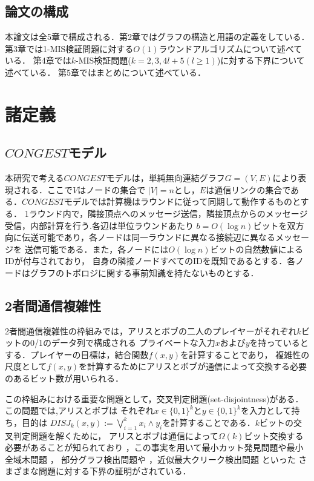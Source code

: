 \documentclass[12pt]{thesis}
\theoremstyle{definition}
\begin{document}
\section{論文の構成}
本論文は全5章で構成される．第2章ではグラフの構造と用語の定義をしている．
第3章では1-MIS検証問題に対する$O(1)$ラウンドアルゴリズムについて述べている．
第4章では$k$-MIS検証問題($k = 2, 3, 4l + 5 ( l \geq 1)$)に対する下界について述べている．
第5章ではまとめについて述べている．

\chapter{諸定義}

\section{$CONGEST$モデル}
本研究で考える$CONGEST$モデルは，単純無向連結グラフ$G = (V, E)$により表現される．ここで$V$はノードの集合で
$|V| = n$とし，$E$は通信リンクの集合である．$CONGEST$モデルでは計算機はラウンドに従って同期して動作するものとする．
1ラウンド内で，隣接頂点へのメッセージ送信，隣接頂点からのメッセージ受信，内部計算を行う.各辺は単位ラウンドあたり
$b = O(\log n)$ビットを双方向に伝送可能であり，各ノードは同一ラウンドに異なる接続辺に異なるメッセージを
送信可能である．また，各ノードには$O(\log n)$ビットの自然数値によるIDが付与されており，
自身の隣接ノードすべてのIDを既知であるとする．各ノードはグラフのトポロジに関する事前知識を持たないものとする．

\section{2者間通信複雑性}
2者間通信複雑性の枠組みでは，アリスとボブの二人のプレイヤーがそれぞれ$k$ビットの0/1のデータ列で構成される
プライベートな入力$x$および$y$を持っているとする．プレイヤーの目標は，結合関数$f(x, y)$を計算することであり，
複雑性の尺度として$f(x, y)$を計算するためにアリスとボブが通信によって交換する必要のあるビット数が用いられる．

この枠組みにおける重要な問題として，交叉判定問題(set-disjointness)がある．この問題では,アリスとボブは
それぞれ$x \in \{0, 1\}^{k}$と$y \in \{0, 1\}^{k}$を入力として持ち，目的は
$DISJ_{k} (x, y) :=\bigvee_{i = 1}^{k} x_{i} \land y_{i}$を計算することである．$k$ビットの交叉判定問題を解くために，
アリスとボブは通信によって$\Omega (k)$ビット交換する必要があることが知られており 
\cite{kalyanasundaram1992probabilistic}，この事実を用いて最小カット発見問題や最小全域木問題 \cite{sarma2012distributed}，
部分グラフ検出問題や \cite{fischer2018possibilities} ，近似最大クリーク検出問題 \cite{czumaj2020detecting} といった
さまざまな問題に対する下界の証明がされている．
\end{document}
